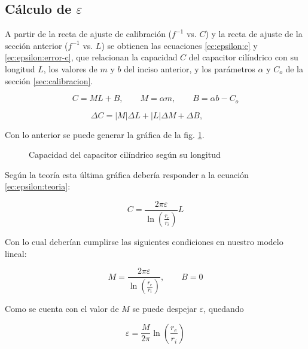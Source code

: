 \subsection{Cálculo de $\varepsilon$}

A partir de la recta de ajuste de calibración ($f^{-1}$ vs. $C$) y la recta de
ajuste de la sección anterior ($f^{-1}$ vs. $L$) se obtienen las ecuaciones
\ref{ec:epsilon:c} y \ref{ec:epsilon:error-c}, que relacionan la capacidad $C$
del capacitor cilíndrico con su longitud $L$, los valores de $m$ y $b$ del
inciso anterior, y los parámetros $\alpha$ y $C_o$ de la sección
\ref{sec:calibracion}.

\begin{equation}
    \label{ec:epsilon:c}
    C = ML + B,\quad\quad
    M = \alpha m, \quad\quad
    B = \alpha b - C_o
\end{equation}

\begin{equation}
    \label{ec:epsilon:error-c}
    \Delta C = \left| M \right| \Delta L 
             + \left| L \right| \Delta M
             + \Delta B, \quad\quad
\end{equation}

Con lo anterior se puede generar la gráfica de la fig. 
\ref{fig:epsilon:cvsl}.

\begin{figure}[H]
    \centering
    
    \caption{Capacidad del capacitor cilíndrico según su longitud}
    \label{fig:epsilon:cvsl}
\end{figure}

Según la teoría esta última gráfica debería responder a la ecuación 
\ref{ec:epsilon:teoria}:

\begin{equation}
    \label{ec:epsilon:teoria}
    C = \frac{2\pi\varepsilon}{\ln\left(\frac{r_e}{r_i}\right)} L
\end{equation}

Con lo cual deberían cumplirse las siguientes condiciones en nuestro modelo
lineal:

\[
    M = \frac{2\pi\varepsilon}{\ln\left(\frac{r_e}{r_i}\right)}, 
    \quad\quad B = 0
\]

Como se cuenta con el valor de $M$ se puede despejar $\varepsilon$, quedando

\begin{equation}
    \label{ec:epsilon:epsilon}
    \varepsilon = \frac{M}{2\pi} \ln \left(\frac{r_e}{r_i}\right)
\end{equation}


